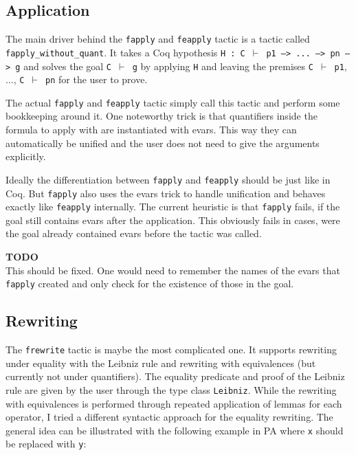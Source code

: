 \documentclass[12pt, a4paper]{article}
\newcommand{\improve}[1]{
	\vspace{3pt}
	\begin{boximprove}
		\parbox{\textwidth}{\textcolor{colorimprove}{\textbf{TODO}\\#1}}
	\end{boximprove}}
\begin{document}
\subsection{Application}

The main driver behind the \texttt{fapply} and \texttt{feapply} tactic is a tactic called \texttt{fapply\_without\_quant}.
It takes a Coq hypothesis \texttt{H : C $\vdash$ p1 --> ... --> pn --> g} and solves the goal \texttt{C $\vdash$ g} by applying \texttt{H} and leaving the premises \texttt{C $\vdash$ p1}, ..., \texttt{C $\vdash$ pn} for the user to prove.

The actual \texttt{fapply} and \texttt{feapply} tactic simply call this tactic and perform some bookkeeping around it.
One noteworthy trick is that quantifiers inside the formula to apply with are instantiated with evars.
This way they can automatically be unified and the user does not need to give the arguments explicitly.

\medskip\noindent
Ideally the differentiation between \texttt{fapply} and \texttt{feapply} should be just like in Coq.
But \texttt{fapply} also uses the evars trick to handle unification and behaves exactly like \texttt{feapply} internally.
The current heuristic is that \texttt{fapply} fails, if the goal still contains evars after the application.
This obviously fails in cases, were the goal already contained evars before the tactic was called.

\improve{This should be fixed. One would need to remember the names of the evars that \texttt{fapply} created and only check for the existence of those in the goal.}

\subsection{Rewriting}

The \texttt{frewrite} tactic is maybe the most complicated one.
It supports rewriting under equality with the Leibniz rule and rewriting with equivalences (but currently not under quantifiers).
The equality predicate and proof of the Leibniz rule are given by the user through the type class \texttt{Leibniz}.
While the rewriting with equivalences is performed through repeated application of lemmas for each operator, I tried a different syntactic approach for the equality rewriting.
The general idea can be illustrated with the following example in PA where \texttt{x} should be replaced with \texttt{y}:
\end{document}
